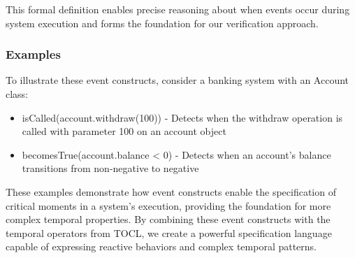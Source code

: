 This formal definition enables precise reasoning about when events occur during system execution and forms the foundation for our verification approach.

\subsubsection{Examples}

To illustrate these event constructs, consider a banking system with an Account class:

\begin{itemize}
    \item isCalled(account.withdraw(100)) - Detects when the withdraw operation is called with parameter 100 on an account object
    \item becomesTrue(account.balance < 0) - Detects when an account's balance transitions from non-negative to negative
\end{itemize}

These examples demonstrate how event constructs enable the specification of critical moments in a system's execution, providing the foundation for more complex temporal properties. By combining these event constructs with the temporal operators from TOCL, we create a powerful specification language capable of expressing reactive behaviors and complex temporal patterns.

